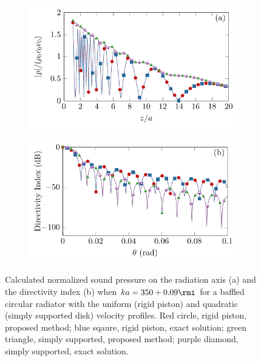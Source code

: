 \begin{figure}[!htb]
    \centering
    \begin{subfigure}{0.49\textwidth}
        \centering
        \includegraphics[width = \textwidth]{fig/compare_prs_200422A_a_v2.pdf}
    \end{subfigure}
    \begin{subfigure}{0.49\textwidth}
        \centering
        \includegraphics[width = \textwidth]{fig/compare_DI_200422A_b_v2.pdf}
    \end{subfigure}
    \caption{Calculated normalized sound pressure on the radiation axis (a) and the directivity index (b) when $ka = 350 + 0.09\rmi$ for a baffled circular radiator with the uniform (rigid piston) and quadratic (simply supported disk) velocity profiles. {Red circle, rigid piston, proposed method; blue sqaure, rigid piston, exact solution; green triangle, simply supported, proposed method; purple diamond, simply supported, exact solution.}}
    \label{fig:swe_piston_soundpressure}
\end{figure}


